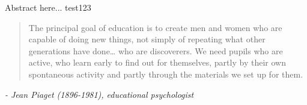 \abstract{}
Abstract here... test123

\begin{quote}
The principal goal of education is to create men and women who are capable of doing new things, not simply of repeating what other generations have done… who are discoverers. We need pupils who are active, who learn early to find out for themselves, partly by their own spontaneous activity and partly through the materials we set up for them.
\end{quote}
 \textit{- Jean Piaget (1896-1981), educational psychologist}

\newpage
\tableofcontents
\newpage
